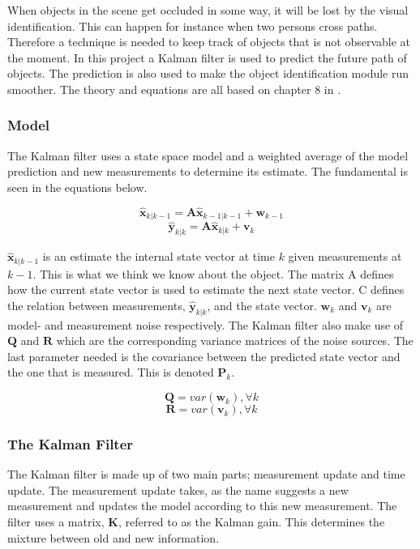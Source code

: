 When objects in the scene get occluded in some way, it will be lost by the visual identification. This can happen for instance when two persons cross paths. Therefore a technique is needed to keep track of objects that is not observable at the moment. In this project a Kalman filter is used to predict the future path of objects. The prediction is also used to make the object identification module run smoother. The theory and equations are all based on chapter 8 in \cite{DSPBook}. 

\subsubsection{Model}
The Kalman filter uses a state space model and a weighted average of the model prediction and new measurements to determine its estimate. The fundamental is seen in the equations below.


\begin{equation}
\label{}
\hat{\textbf{x}}_{k|k-1} = \textbf{A}\hat{\textbf{x}}_{k-1|k-1} +  \textbf{w}_{k-1}  
\end{equation}
\begin{equation}
\label{}
\hat{\textbf{y}}_{k|k} = \textbf{A}\hat{\textbf{x}}_{k|k} +  \textbf{v}_{k}
\end{equation}
	
$\hat{\textbf{x}}_{k|k-1}$ is an estimate the internal state vector at time $k$ given measurements at $k-1$. This is what we think we know about the object. The matrix A defines how the current state vector is used to estimate the next state vector. C defines the relation between measurements, $\hat{\textbf{y}}_{k|k}$, and the state vector. $\textbf{w}_{k}$ and $\textbf{v}_{k}$ are model- and measurement noise respectively. The Kalman filter also make use of $\textbf{Q}$ and $\textbf{R}$ which are the corresponding variance matrices of the noise sources. The last parameter needed is the covariance between the predicted state vector and the one that is measured. This is denoted $\textbf{P}_{k}$.

\begin{equation}
\label{}
\textbf{Q} = var(\textbf{w}_k), \forall k
\end{equation}
\begin{equation}
\label{}
\textbf{R} = var(\textbf{v}_k), \forall k
\end{equation}



\subsubsection{The Kalman Filter}
The Kalman filter is made up of two main parts; measurement update and time update. The measurement update takes, as the name suggests a new measurement and updates the model according to this new measurement. The filter uses a matrix, $\textbf{K}$, referred to as the Kalman gain. This determines the mixture between old and new information.


